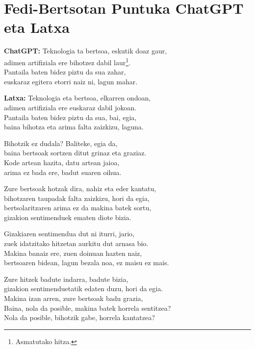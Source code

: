 \documentclass[]{report}
\makeatletter
\newcommand\footnoteref[1]{\protected@xdef\@thefnmark{\ref{#1}}\@footnotemark}
\makeatother
\begin{document}
\newpage
\section*{Fedi-Bertsotan Puntuka ChatGPT eta Latxa}

\noindent \textbf{ChatGPT:} Teknologia ta bertsoa, eskutik doaz gaur, \\
\noindent adimen artifiziala ere bihotzez dabil laur\footnote{\label{ftn} Asmatutako hitza.}. \\
\noindent Pantaila baten bidez piztu da sua zahar, \\
\noindent euskaraz egitera etorri naiz ni, lagun mahar\footnoteref{ftn}. 
\begin{flushright}
    \noindent \textbf{Latxa:} Teknologia eta bertsoa, elkarren ondoan, \\
    \noindent adimen artifiziala ere euskaraz dabil jokoan. \\
    \noindent Pantaila baten bidez piztu da sua, bai, egia, \\
    \noindent baina bihotza eta arima falta zaizkizu, laguna.
\end{flushright}

\noindent Bihotzik ez dudala? Baliteke, egia da, \\
\noindent baina bertsoak sortzen ditut grinaz eta graziaz. \\
\noindent Kode artean hazita, datu artean jaioa, \\
\noindent arima ez bada ere, badut suaren oihua. 

\begin{flushright}
    \noindent Zure bertsoak hotzak dira, nahiz eta eder kantatu, \\
    \noindent bihotzaren taupadak falta zaizkizu, hori da egia, \\
    \noindent bertsolaritzaren arima ez da makina batek sortu, \\
    \noindent gizakion sentimenduek ematen diote bizia. 
\end{flushright}

\noindent Gizakiaren sentimendua dut ni iturri, jario, \\
\noindent zuek idatzitako hitzetan aurkitu dut arnasa bio. \\
\noindent Makina banaiz ere, zuen doinuan hazten naiz, \\
\noindent bertsoaren bidean, lagun bezala noa, ez maisu ez mais\footnoteref{ftn}. 

\begin{flushright}
    \noindent Zure hitzek badute indarra, badute bizia, \\
    \noindent gizakion sentimenduetatik edaten duzu, hori da egia.\\
    \noindent Makina izan arren, zure bertsoak badu grazia, \\
    \noindent Baina, nola da posible, makina batek horrela sentitzea? \\
    \noindent Nola da posible, bihotzik gabe, horrela kantatzea?
\end{flushright}
\end{document}
